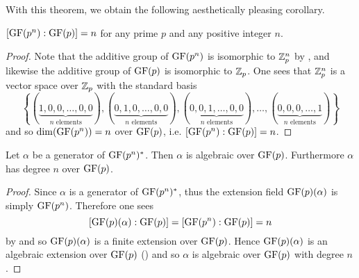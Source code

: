 With this theorem, we obtain the following aesthetically pleasing corollary.

\begin{corollary}\label{corollary-degree-of-finite-field-to-prime-power}
    $[\mathrm{GF}(p^n): \mathrm{GF}(p)] = n$ for any prime $p$ and any positive integer $n$.
\end{corollary}
\begin{proof}
    Note that the additive group of $\mathrm{GF}(p^n)$ is isomorphic to $\mathbb{Z}_p^n$ by , and likewise the additive group of $\mathrm{GF}(p)$ is isomorphic to $\mathbb{Z}_p$. One sees that $\mathbb{Z}_p^n$ is a vector space over $\mathbb{Z}_p$ with the standard basis
    \[
        \left\{(\underbrace{1, 0, 0, \dots, 0, 0}_{n \text{ elements}}), (\underbrace{0, 1, 0, \dots, 0, 0}_{n \text{ elements}}), (\underbrace{0, 0, 1, \dots, 0, 0}_{n \text{ elements}}), \dots, (\underbrace{0, 0, 0, \dots, 1}_{n \text{ elements}})\right\}
    \]
    and so $\dim{\GF{p^n}} = n$ over $\mathrm{GF}(p)$, i.e. $[\mathrm{GF}(p^n): \mathrm{GF}(p)] = n$.
\end{proof}

\begin{corollary}\label{corollary-generator-of-finite-field-is-algebraic-over-subfield}
    Let $\alpha$ be a generator of $\mathrm{GF}(p^n)^\ast$. Then $\alpha$ is algebraic over $\mathrm{GF}(p)$. Furthermore $\alpha$ has degree $n$ over $\mathrm{GF}(p)$.
\end{corollary}
\begin{proof}
    Since $\alpha$ is a generator of $\mathrm{GF}(p^n)^\ast$, thus the extension field $\mathrm{GF}(p)(\alpha)$ is simply $\mathrm{GF}(p^n)$. Therefore one sees
    \[
        [\mathrm{GF}(p)(\alpha): \mathrm{GF}(p)] = [\mathrm{GF}(p^n):\mathrm{GF}(p)] = n
    \]
    by  and so $\mathrm{GF}(p)(\alpha)$ is a finite extension over $\mathrm{GF}(p)$. Hence $\mathrm{GF}(p)(\alpha)$ is an algebraic extension over $\mathrm{GF}(p)$ () and so $\alpha$ is algebraic over $\mathrm{GF}(p)$ with degree $n$.
\end{proof}

